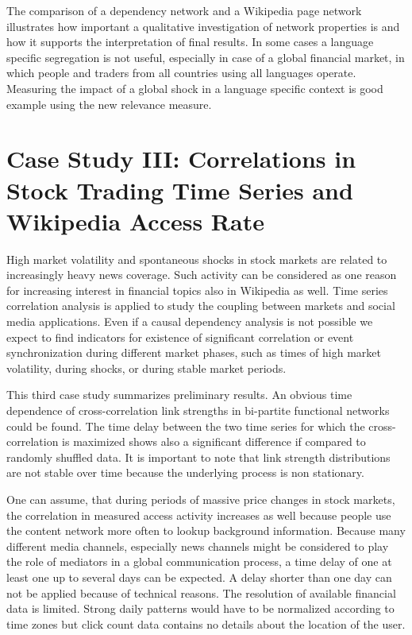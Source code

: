 \documentclass[a4paper,10pt]{scrbook}
\begin{document}


The comparison of a dependency network and a Wikipedia page network illustrates how important a qualitative investigation of network properties is and how it supports the interpretation of final results. In some cases a language specific segregation is not useful, especially in case of a global financial market, in which people and traders from all countries using all languages operate. Measuring the impact of a global shock in a language specific context is good example using the new relevance measure. 
 \label{ext.fig.TRIFinanz} 
 
 
 
 
\clearpage
\section{Case Study III: Correlations in Stock Trading Time Series and Wikipedia Access Rate }
\label{CASEIII}
High market volatility and spontaneous shocks in stock markets are related to increasingly heavy news coverage. Such activity can be considered as one reason for increasing interest in financial topics also in Wikipedia as well. Time series correlation analysis is applied to study the coupling between markets and social media applications. Even if a causal dependency analysis is not possible we expect to find indicators for existence of significant correlation or event synchronization during different market phases, such as times of high market volatility, during shocks, or during stable market periods. 

This third case study summarizes preliminary results. An obvious time dependence of cross-correlation link strengths in bi-partite functional networks could be found. The time delay between the two time series for which the cross-correlation is maximized shows also a significant difference if compared to randomly shuffled data. It is important to note that link strength distributions are not stable over time because the underlying process is non stationary.

One can assume, that during periods of massive price changes in stock markets, the correlation in measured access activity increases as well because people use the content network more often to lookup background information. Because many different media channels, especially news channels might be considered to play the role of mediators in a global communication process, a time delay of one at least one up to several days can be expected. A delay shorter than one day can not be applied because of technical reasons. The resolution of available financial data is limited. Strong daily patterns would have to be normalized according to time zones but click count data contains no details about the location of the user.  
\end{document}
